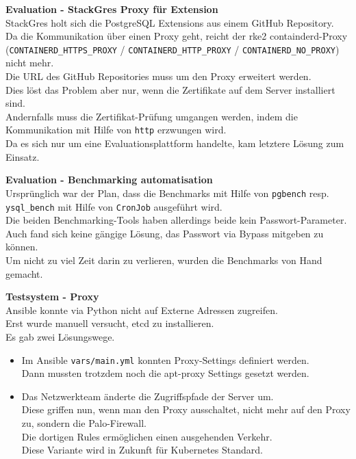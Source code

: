 \begin{flushleft}
\begin{description}
        \item \textbf{Evaluation - StackGres Proxy für Extension}\hfill \\StackGres holt sich die PostgreSQL Extensions aus einem \Gls{GitHub} Repository.\\Da die Kommunikation über einen Proxy geht, reicht der \gls{rke2} containderd-Proxy (\texttt{CONTAINERD\_HTTPS\_PROXY} / \texttt{CONTAINERD\_HTTP\_PROXY} / \texttt{CONTAINERD\_NO\_PROXY}) nicht mehr.\\Die URL des \Gls{GitHub} Repositories muss um den Proxy erweitert werden.\\Dies löst das Problem aber nur, wenn die Zertifikate auf dem Server installiert sind.\\Andernfalls muss die Zertifikat-Prüfung umgangen werden, indem die Kommunikation mit Hilfe von \texttt{http} erzwungen wird.\\Da es sich nur um eine Evaluationsplattform handelte, kam letztere Lösung zum Einsatz.
        \item \textbf{Evaluation - Benchmarking automatisation}\hfill \\Ursprünglich war der Plan, dass die Benchmarks mit Hilfe von \texttt{pgbench} resp. \texttt{ysql\_bench} mit Hilfe von \texttt{CronJob} ausgeführt wird.\\Die beiden Benchmarking-Tools haben allerdings beide kein Passwort-Parameter.\\Auch fand sich keine gängige Lösung, das Passwort via Bypass mitgeben zu können.\\Um nicht zu viel Zeit darin zu verlieren, wurden die Benchmarks von Hand gemacht.
        \item \textbf{Testsystem - Proxy}\hfill \\Ansible konnte via Python nicht auf Externe Adressen zugreifen.\\Erst wurde manuell versucht, etcd zu installieren.\\Es gab zwei Lösungswege.
        \begin{itemize}
            \item Im \Gls{Ansible} \texttt{vars/main.yml} konnten Proxy-Settings definiert werden.\\Dann mussten trotzdem noch die apt-proxy Settings gesetzt werden.
            \item Das Netzwerkteam änderte die Zugriffspfade der Server um.\\Diese griffen nun, wenn man den Proxy ausschaltet, nicht mehr auf den Proxy zu, sondern die Palo-Firewall.\\Die dortigen Rules ermöglichen einen ausgehenden Verkehr.\\Diese Variante wird in Zukunft für \Gls{Kubernetes} Standard.
        \end{itemize}
    \end{description}
\end{flushleft}